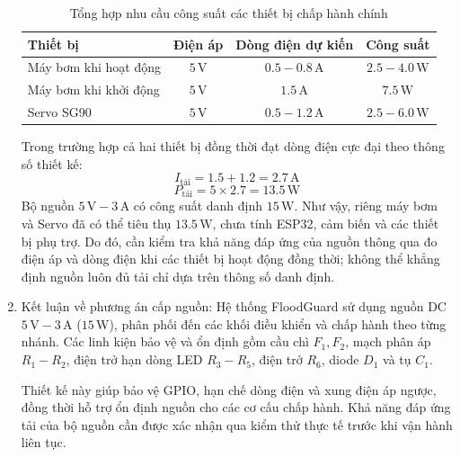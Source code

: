 \begin{enumerate}
    \begin{table}[H]
        \centering
        \small
        \renewcommand{\arraystretch}{1.2}
        \caption{Tổng hợp nhu cầu công suất các thiết bị chấp hành chính}
        \label{tab:power_budget}
        \begin{tabular}{|l|c|c|c|}
            \hline
            \textbf{Thiết bị} & \textbf{Điện áp} & \textbf{Dòng điện dự kiến} & \textbf{Công suất} \\ \hline
            Máy bơm khi hoạt động & $5\,\text{V}$ & $0.5 - 0.8\,\text{A}$ & $2.5 - 4.0\,\text{W}$ \\ \hline
            Máy bơm khi khởi động & $5\,\text{V}$ & $1.5\,\text{A}$ & $7.5\,\text{W}$ \\ \hline
            Servo SG90 & $5\,\text{V}$ & $0.5 - 1.2\,\text{A}$ & $2.5 - 6.0\,\text{W}$ \\ \hline
        \end{tabular}
    \end{table}

    Trong trường hợp cả hai thiết bị đồng thời đạt dòng điện cực đại theo thông số thiết kế:
    \begin{equation}
        I_{\text{tải}} = 1.5 + 1.2 = 2.7\,\text{A}
    \end{equation}
    \begin{equation}
        P_{\text{tải}} = 5 \times 2.7 = 13.5\,\text{W}
    \end{equation}
    Bộ nguồn $5\,\text{V} - 3\,\text{A}$ có công suất danh định $15\,\text{W}$. Như vậy, riêng máy bơm và Servo đã có thể tiêu thụ $13.5\,\text{W}$, chưa tính ESP32, cảm biến và các thiết bị phụ trợ. Do đó, cần kiểm tra khả năng đáp ứng của nguồn thông qua đo điện áp và dòng điện khi các thiết bị hoạt động đồng thời; không thể khẳng định nguồn luôn đủ tải chỉ dựa trên thông số danh định.

    \item Kết luận về phương án cấp nguồn:
    Hệ thống FloodGuard sử dụng nguồn DC $5\,\text{V} - 3\,\text{A}$ ($15\,\text{W}$), phân phối đến các khối điều khiển và chấp hành theo từng nhánh. Các linh kiện bảo vệ và ổn định gồm cầu chì $F_1, F_2$, mạch phân áp $R_1 - R_2$, điện trở hạn dòng LED $R_3 - R_5$, điện trở $R_6$, diode $D_1$ và tụ $C_1$.

    Thiết kế này giúp bảo vệ GPIO, hạn chế dòng điện và xung điện áp ngược, đồng thời hỗ trợ ổn định nguồn cho các cơ cấu chấp hành. Khả năng đáp ứng tải của bộ nguồn cần được xác nhận qua kiểm thử thực tế trước khi vận hành liên tục.
\end{enumerate}

